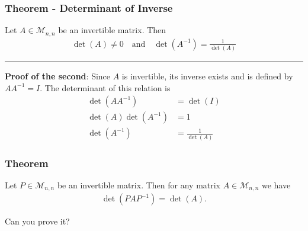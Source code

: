 \documentclass[usenames,dvipsnames,aspectratio=169,10pt]{beamer}
\numberwithin{equation}{section}
\begin{document}
\begin{frame}
\frametitle{Theorem - Determinant of Inverse}
Let $A\in\mathcal{M}_{n,n}$ be an invertible matrix. Then
\begin{align*}
\det(A) \neq 0 
\quad \text{and} \quad 
\det(A^{-1})=\frac{1}{\det(A)}
\end{align*}
\vspace{-0.5cm}\begin{center} \textcolor{airforceblue}{\rule{0.7\textwidth}{0.3mm}} \end{center}\vspace{-0.2cm}

\textbf{Proof of the second}: Since $A$ is invertible, its inverse exists and is defined by $AA^{-1}=I$. The determinant of this relation is
\begin{align*}
\det(AA^{-1}) &= \det(I) \\
\det(A)\det(A^{-1}) &= 1 \\
\det(A^{-1}) &=\frac{1}{\det(A)}
\end{align*}
\end{frame}





\begin{frame}
\frametitle{Theorem}
Let $P\in\mathcal{M}_{n,n}$ be an invertible matrix. Then for any matrix $A\in\mathcal{M}_{n,n}$ we have
\begin{align*}
\det(PAP^{-1}) = \det(A).
\end{align*}

Can you prove it?
\end{frame}
\end{document}
